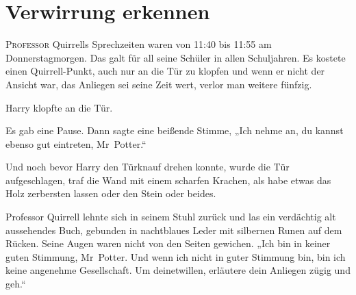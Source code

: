 \chapter{Verwirrung erkennen}


\lettrine{P}{rofessor} Quirrells Sprechzeiten waren von 11:40 bis 11:55 am Donnerstagmorgen. Das galt für all seine Schüler in allen Schuljahren. Es kostete einen Quirrell-Punkt, auch nur an die Tür zu klopfen und wenn er nicht der Ansicht war, das Anliegen sei seine Zeit wert, verlor man weitere fünfzig.

Harry klopfte an die Tür.

Es gab eine Pause. Dann sagte eine beißende Stimme,
„Ich nehme an, du kannst ebenso gut eintreten, Mr~Potter.“

Und noch bevor Harry den Türknauf drehen konnte, wurde die Tür aufgeschlagen, traf die Wand mit einem scharfen Krachen, als habe etwas das Holz zerbersten lassen oder den Stein oder beides.

Professor Quirrell lehnte sich in seinem Stuhl zurück und las ein verdächtig alt aussehendes Buch, gebunden in nachtblaues Leder mit silbernen Runen auf dem Rücken. Seine Augen waren nicht von den Seiten gewichen.
„Ich bin in keiner guten Stimmung, Mr~Potter. Und wenn ich nicht in guter Stimmung bin, bin ich keine angenehme Gesellschaft. Um deinetwillen, erläutere dein Anliegen zügig und geh.“

